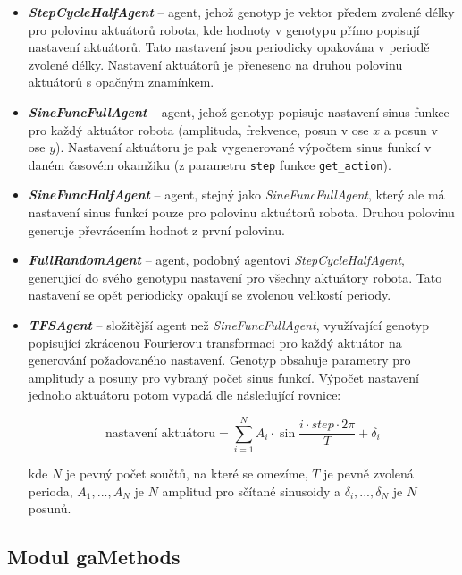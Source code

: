 \begin{itemize}
    \item \textbf{\emph{StepCycleHalfAgent}} -- agent, jehož genotyp je vektor předem
        zvolené délky pro polovinu aktuátorů robota, kde hodnoty v genotypu přímo
        popisují nastavení aktuátorů. Tato nastavení jsou periodicky opakována
        v periodě zvolené délky. Nastavení aktuátorů je přeneseno na druhou
        polovinu aktuátorů s opačným znamínkem.
    \item \textbf{\emph{SineFuncFullAgent}} -- agent, jehož genotyp popisuje nastavení
        sinus funkce pro každý aktuátor robota (amplituda, frekvence, posun v
        ose $x$ a posun v ose $y$). Nastavení aktuátoru je pak vygenerované
        výpočtem sinus funkcí v daném časovém okamžiku (z parametru
        \texttt{step} funkce \texttt{get\_action}).
    \item \textbf{\emph{SineFuncHalfAgent}} -- agent, stejný jako
        \emph{SineFuncFullAgent}, který ale má nastavení sinus funkcí pouze pro
        polovinu aktuátorů robota. Druhou polovinu generuje převrácením hodnot
        z první polovinu.
    \item \textbf{\emph{FullRandomAgent}} -- agent, podobný agentovi
        \emph{StepCycleHalfAgent}, generující do svého genotypu nastavení pro všechny
        aktuátory robota. Tato nastavení se opět periodicky opakují se zvolenou
        velikostí periody.
    \item \textbf{\emph{TFSAgent}} -- složitější agent než \emph{SineFuncFullAgent},
        využívající genotyp popisující zkrácenou Fourierovu transformaci pro
        každý aktuátor na generování požadovaného nastavení. Genotyp obsahuje
        parametry pro amplitudy a posuny pro vybraný počet sinus funkcí.
        Výpočet nastavení jednoho aktuátoru potom vypadá dle následující
        rovnice:

        \begin{equation}
            \text{nastavení aktuátoru} = \sum_{i=1}^{N}A_i\cdot\sin\frac{i\cdot
            step\cdot2\pi}{T} + \delta_i
        \end{equation}

        kde $N$ je pevný počet součtů, na které se omezíme, $T$ je pevně
        zvolená perioda, $A_1,...,A_N$ je $N$ amplitud pro sčítané sinusoidy a
        $\delta_i,...,\delta_N$ je $N$ posunů.
\end{itemize}

\subsection{Modul gaMethods} \label{imp:gaMethods}


